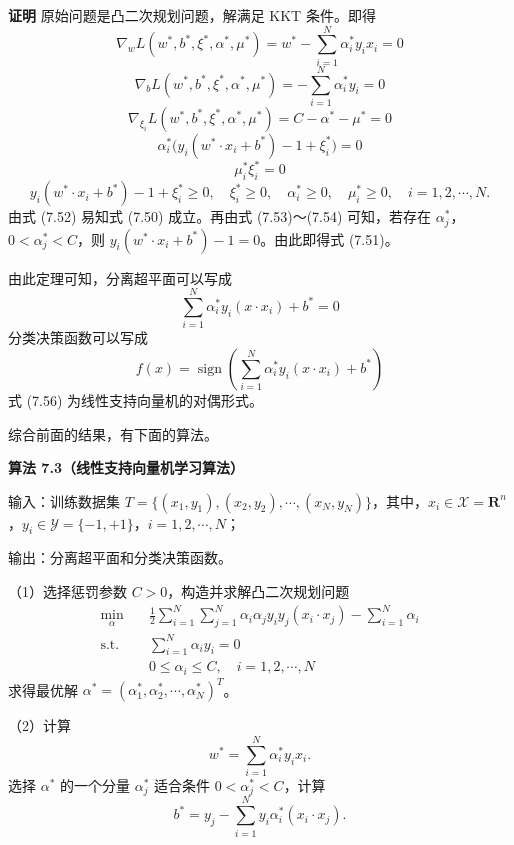 \documentclass[UTF8, 12pt, fontset=fandol, oneside]{ctexart}
\begin{document}
\noindent\textbf{证明}\quad
原始问题是凸二次规划问题，解满足 KKT 条件。即得
\begin{equation}
\nabla_w L(w^*,b^*,\xi^*,\alpha^*,\mu^*)=w^*-\sum_{i=1}^N\alpha_i^*y_i x_i=0
\tag{7.52}
\end{equation}
\[
\nabla_b L(w^*,b^*,\xi^*,\alpha^*,\mu^*)=-\sum_{i=1}^N\alpha_i^*y_i=0
\]
\[
\nabla_{\xi_i} L(w^*,b^*,\xi^*,\alpha^*,\mu^*)=C-\alpha^*-\mu^*=0
\]
\begin{equation}
\alpha_i^*\bigl(y_i(w^*\cdot x_i+b^*)-1+\xi_i^*\bigr)=0
\tag{7.53}
\end{equation}
\begin{equation}
\mu_i^*\xi_i^*=0
\tag{7.54}
\end{equation}
\[
y_i(w^*\cdot x_i+b^*)-1+\xi_i^*\geq 0,\quad
\xi_i^*\geq 0,\quad
\alpha_i^*\geq 0,\quad
\mu_i^*\geq 0,\quad i=1,2,\cdots,N.
\]
由式 (7.52) 易知式 (7.50) 成立。再由式 (7.53)～(7.54) 可知，若存在 $\alpha_j^*$，$0<\alpha_j^*<C$，则 $y_i(w^*\cdot x_i+b^*)-1=0$。由此即得式 (7.51)。

由此定理可知，分离超平面可以写成
\begin{equation}
\sum_{i=1}^N\alpha_i^*y_i(x\cdot x_i)+b^*=0
\tag{7.55}
\end{equation}
分类决策函数可以写成
\begin{equation}
f(x)=\operatorname{sign}\left(\sum_{i=1}^N\alpha_i^*y_i(x\cdot x_i)+b^*\right)
\tag{7.56}
\end{equation}
式 (7.56) 为线性支持向量机的对偶形式。

综合前面的结果，有下面的算法。

\noindent\textbf{算法 7.3（线性支持向量机学习算法）}

输入：训练数据集 $T=\{(x_1,y_1),(x_2,y_2),\cdots,(x_N,y_N)\}$，其中，$x_i\in\mathcal{X}=\mathbf{R}^n$，$y_i\in\mathcal{Y}=\{-1,+1\}$，$i=1,2,\cdots,N$；

输出：分离超平面和分类决策函数。

（1）选择惩罚参数 $C>0$，构造并求解凸二次规划问题
\[
\begin{aligned}
\min_\alpha\quad & \frac{1}{2}\sum_{i=1}^N\sum_{j=1}^N\alpha_i\alpha_j y_i y_j(x_i\cdot x_j)-\sum_{i=1}^N\alpha_i\\
\mathrm{s.t.}\quad & \sum_{i=1}^N\alpha_i y_i=0\\
& 0\leq \alpha_i\leq C,\quad i=1,2,\cdots,N
\end{aligned}
\]
求得最优解 $\alpha^*=(\alpha_1^*,\alpha_2^*,\cdots,\alpha_N^*)^T$。

（2）计算
\[
w^*=\sum_{i=1}^N\alpha_i^*y_i x_i.
\]
选择 $\alpha^*$ 的一个分量 $\alpha_j^*$ 适合条件 $0<\alpha_j^*<C$，计算
\[
b^*=y_j-\sum_{i=1}^N y_i\alpha_i^*(x_i\cdot x_j).
\]
\end{document}
